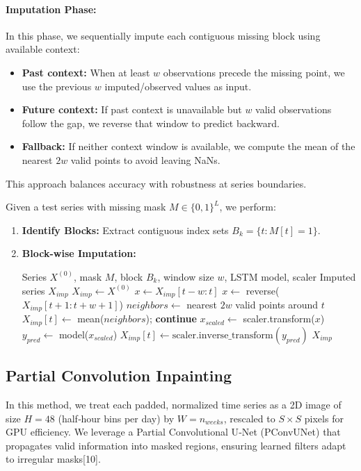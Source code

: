 \documentclass[10pt,twocolumn]{article}
\begin{document}
	\paragraph{Imputation Phase:}
	In this phase, we sequentially impute each contiguous missing block using available context:
	\begin{itemize}
		\item \textbf{Past context:} When at least $w$ observations precede the missing point, we use the previous $w$ imputed/observed values as input.
		\item \textbf{Future context:} If past context is unavailable but $w$ valid observations follow the gap, we reverse that window to predict backward.
		\item \textbf{Fallback:} If neither context window is available, we compute the mean of the nearest $2w$ valid points to avoid leaving NaNs.
	\end{itemize}
	This approach balances accuracy with robustness at series boundaries.

	Given a test series with missing mask $M \in \{0,1\}^L$, we perform:
	\begin{enumerate}
		\item \textbf{Identify Blocks:} Extract contiguous index sets $B_k = \{t : M[t]=1\}$.
		\item \textbf{Block-wise Imputation:}
		\begin{algorithm}[H]
			\caption{Block-wise LSTM Imputation}
			\begin{algorithmic}[1]
				\Require Series $X^{(0)}$, mask $M$, block $B_k$, window size $w$, LSTM model, scaler
				\Ensure Imputed series $X_{imp}$
				\State $X_{imp} \gets X^{(0)}$
				\State $x \gets X_{imp}[t-w : t]$
				\State $x \gets$ reverse($X_{imp}[t+1 : t+w+1]$)
				\Else  %
				\State $neighbors \gets$ nearest $2w$ valid points around $t$
				\State $X_{imp}[t] \gets$ mean($neighbors$); \textbf{continue}
				\EndIf
				\State $x_{scaled} \gets$ scaler.transform($x$)
				\State $y_{pred} \gets$ model($x_{scaled}$)
				\State $X_{imp}[t] \gets \text{scaler.inverse\_transform}(y_{pred})$
				\EndFor
				\State \Return $X_{imp}$
			\end{algorithmic}
		\end{algorithm}
	\end{enumerate}
	
	
	\subsection{Partial Convolution Inpainting}
	In this method, we treat each padded, normalized time series as a 2D image of size $H=48$ (half‐hour bins per day) by $W=n_{weeks}$, rescaled to $S\times S$ pixels for GPU efficiency. We leverage a Partial Convolutional U‑Net (PConvUNet) that propagates valid information into masked regions, ensuring learned filters adapt to irregular masks[10].
	
\end{document}
